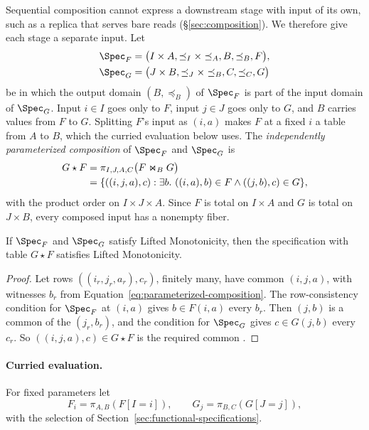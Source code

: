 Sequential composition cannot express a downstream stage with input of its
own, such as a replica that serves bare reads (\S\ref{sec:composition}).  We
therefore give each stage a separate input.  Let
\begin{align*}
  \Spec_F&=\bigl(I\times A,\preceq_I\times\preceq_A,B,\preceq_B,F\bigr),\\
  \Spec_G&=\bigl(J\times B,\preceq_J\times\preceq_B,C,\preceq_C,G\bigr)
\end{align*}
be \spectype[s] in which the output domain $(B,\preceq_B)$ of $\Spec_F$ is
part of the input domain of $\Spec_G$.  Input $i\in I$ goes only to $F$,
input $j\in J$ goes only to $G$, and $B$ carries values from $F$ to $G$.
Splitting $F$'s input as $(i,a)$ makes $F$ at a fixed $i$ a table from $A$ to
$B$, which the curried evaluation below uses.  The \emph{independently
parameterized composition} of $\Spec_F$ and $\Spec_G$ is
\begin{align}
  G\star F
  &=\pi_{I,J,A,C}\bigl(F\Join_{B}G\bigr) \notag\\
  &=\{((i,j,a),c):\exists b.\ ((i,a),b)\in F
                         \land ((j,b),c)\in G\},
  \label{eq:parameterized-composition}
\end{align}
with the product order on $I\times J\times A$.  Since $F$ is total on
$I\times A$ and $G$ is total on $J\times B$, every composed input has a
nonempty fiber.

\begin{lemma}
\label{lem:parameterized-composition}
If $\Spec_F$ and $\Spec_G$ satisfy Lifted Monotonicity, then the specification
with table $G\star F$ satisfies Lifted Monotonicity.
\end{lemma}

\begin{proof}
Let rows $((i_r,j_r,a_r),c_r)$, finitely many, have common \indesc $(i,j,a)$,
with witnesses $b_r$ from Equation~\ref{eq:parameterized-composition}.  The
row-consistency condition for $\Spec_F$ at $(i,a)$ gives $b\in F(i,a)$
\outrelpart every $b_r$.  Then $(j,b)$ is a common \indesc of the
$(j_r,b_r)$, and the condition for $\Spec_G$ gives $c\in G(j,b)$ \outrelpart
every $c_r$.  So $((i,j,a),c)\in G\star F$ is the required common \outnoun.
\end{proof}

\paragraph{Curried evaluation.}
For fixed parameters let
\begin{equation}
  F_i=\pi_{A,B}(F[I=i]),
  \qquad
  G_j=\pi_{B,C}(G[J=j]),
  \label{eq:curried-fibers}
\end{equation}
with the selection of Section~\ref{sec:functional-specifications}.

